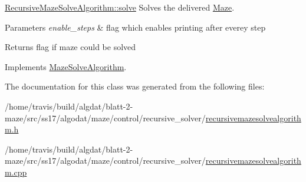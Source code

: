 \hyperlink{class_recursive_maze_solve_algorithm_a15c3571e131dffc45ab62a2073aa0da4}{Recursive\-Maze\-Solve\-Algorithm\-::solve} Solves the delivered \hyperlink{class_maze}{Maze}. 


\begin{DoxyParams}{Parameters}
{\em enable\-\_\-steps} & flag which enables printing after everey step \\
\hline
\end{DoxyParams}
\begin{DoxyReturn}{Returns}
flag if maze could be solved 
\end{DoxyReturn}


Implements \hyperlink{class_maze_solve_algorithm_a3f957367c4afe52d29b0021766a478be}{Maze\-Solve\-Algorithm}.



The documentation for this class was generated from the following files\-:\begin{DoxyCompactItemize}
\item 
/home/travis/build/algdat/blatt-\/2-\/maze/src/ss17/algodat/maze/control/recursive\-\_\-solver/\hyperlink{recursivemazesolvealgorithm_8h}{recursivemazesolvealgorithm.\-h}\item 
/home/travis/build/algdat/blatt-\/2-\/maze/src/ss17/algodat/maze/control/recursive\-\_\-solver/\hyperlink{recursivemazesolvealgorithm_8cpp}{recursivemazesolvealgorithm.\-cpp}\end{DoxyCompactItemize}
